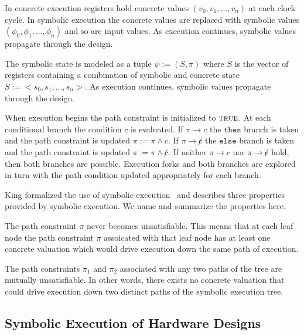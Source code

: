 In concrete execution registers hold concrete values $(v_0, v_1, \ldots, v_n)$
at each clock cycle. In symbolic execution the concrete values are replaced with
symbolic values $(\phi_0, \phi_1, \ldots, \phi_n)$ and so are input values.
As execution continues, symbolic values propagate through the design.

The symbolic state is modeled as a tuple $\psi := (S,\pi)$ where $S$ is the
vector of registers containing a combination of symbolic and concrete state $S
:= <s_0, s_1, \ldots, s_n>$. As execution continues, symbolic values propagate
through the design.

When execution begins the path constraint is initialized to $\mathtt{\textsc{true}}$. At
each conditional branch the condition $c$ is evaluated. If $\pi \rightarrow c$
the $\mathtt{then}$ branch is taken and the path constraint is
updated $\pi := \pi \wedge c$. If $\pi \rightarrow \not c$ the $\mathtt{else}$
branch is taken and the path constraint is updated $\pi := \pi \wedge \not
c$. If neither $\pi \rightarrow c$ nor $\pi \rightarrow \not c$ hold, then both
branches are possible. Execution forks and both branches are explored in turn
with the path condition updated appropriately for each branch.

King formalized the use of symbolic execution~\cite{??} and describes three
properties provided by symbolic execution. We name and summarize the properties
here.
\begin{property}
  \label{prop:kingsound}
  The path constraint $\pi$ never becomes unsatisfiable. This means that at each
  leaf node the path constraint $\pi$ assoicated with that leaf node has at
  least one concrete valuation which would drive execution down the same path of
  execution.
\end{property}
\begin{property}
  \label{prop:kingunique}
The path constraints $\pi_1$ and $\pi_2$ associated with any two paths of the
tree are mutually unsatisfiable. In other words, there exists no concrete
valuation that could drive execution down two distinct paths of the symbolic
execution tree.
\end{property}
\begin{property}[Commutativity]
\end{property}

\subsection{Symbolic Execution of Hardware Designs}





